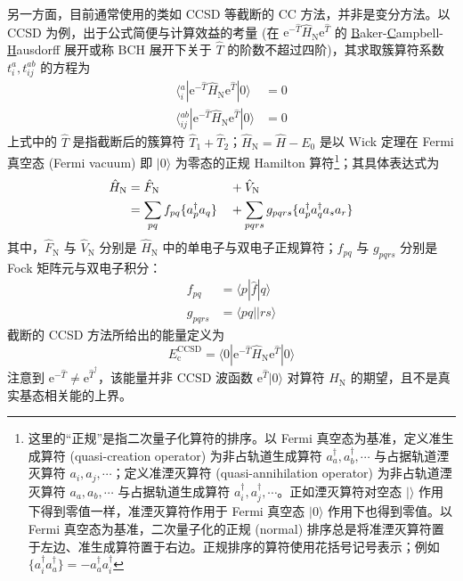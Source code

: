 另一方面，目前通常使用的类如 CCSD 等截断的 CC 方法，并非是变分方法。以 CCSD 为例，出于公式简便与计算效益的考量 (在 $\mathrm{e}^{-\hat T} \hat H_\mathrm{N} \mathrm{e}^{\hat T}$ 的 \underline{B}aker-\underline{C}ampbell-\underline{H}ausdorff 展开或称 BCH 展开下关于 $\hat T$ 的阶数不超过四阶)，其求取簇算符系数 $t_i^a, t_{ij}^{ab}$ 的方程为
\begin{align}
  \langle {}_i^a | \mathrm{e}^{-\hat T} \hat H_\mathrm{N} \mathrm{e}^{\hat T} | 0 \rangle &= 0 \\
  \label{eq.ccsd-t2amplitude}
  \langle {}_{ij}^{ab} | \mathrm{e}^{-\hat T} \hat H_\mathrm{N} \mathrm{e}^{\hat T} | 0 \rangle &= 0
\end{align}
上式中的 $\hat T$ 是指截断后的簇算符 $\hat T_1 + \hat T_2$；$\hat H_\mathrm{N} = \hat H - E_0$ 是以 Wick 定理在 Fermi 真空态 (Fermi vacuum) 即 $| 0 \rangle$ 为零态的正规 Hamilton 算符\footnote{这里的“正规”是指二次量子化算符的排序。以 Fermi 真空态为基准，定义准生成算符 (quasi-creation operator) 为非占轨道生成算符 $a_a^\dagger, a_b^\dagger, \cdots$ 与占据轨道湮灭算符 $a_i, a_j, \cdots$；定义准湮灭算符 (quasi-annihilation operator) 为非占轨道湮灭算符 $a_a, a_b, \cdots$ 与占据轨道生成算符 $a_i^\dagger, a_j^\dagger, \cdots$。正如湮灭算符对空态 $| \rangle$ 作用下得到零值一样，准湮灭算符作用于 Fermi 真空态 $| 0 \rangle$ 作用下也得到零值。以 Fermi 真空态为基准，二次量子化的正规 (normal) 排序总是将准湮灭算符置于左边、准生成算符置于右边。正规排序的算符使用花括号记号表示；例如 $\{a_i^\dagger a_a^\dagger\} = - a_a^\dagger a_i^\dagger$}；其具体表达式为
\begin{alignat}{10}
  \label{eq.norm-hamiltonian}
  \hat H_\mathrm{N} &= \hat F_\mathrm{N} &&+ \hat V_\mathrm{N} \notag\\
  &= \sum_{pq} f_{pq} \{ a_p^\dagger a_q \} &&+ \sum_{pqrs} g_{pqrs} \{ a_p^\dagger a_q^\dagger a_s a_r \}
\end{alignat}
其中，$\hat F_\mathrm{N}$ 与 $\hat V_\mathrm{N}$ 分别是 $\hat H_\mathrm{N}$ 中的单电子与双电子正规算符；$f_{pq}$ 与 $g_{pqrs}$ 分别是 Fock 矩阵元与双电子积分：
\begin{align}
  f_{pq} &= \langle p | \hat f | q \rangle \\
  g_{pqrs} &= \langle pq || rs \rangle
\end{align}
截断的 CCSD 方法所给出的能量定义为
\begin{equation}
  \label{eq.ccsd-energy}
  E_\mathrm{c}^\mathrm{CCSD} = \langle 0 | \mathrm{e}^{-\hat T} \hat H_\mathrm{N} \mathrm{e}^{\hat T} | 0 \rangle
\end{equation}
注意到 $\mathrm{e}^{- \hat T} \neq \mathrm{e}^{\hat T^\dagger}$，该能量并非 CCSD 波函数 $\mathrm{e}^{\hat T} | 0 \rangle$ 对算符 $\hat H_\mathrm{N}$ 的期望，且不是真实基态相关能的上界。

